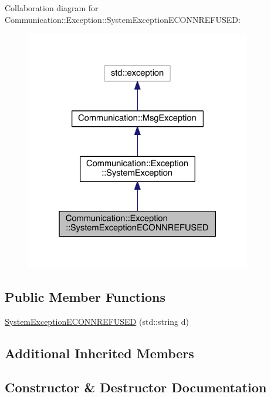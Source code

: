 Collaboration diagram for Communication\+:\+:Exception\+:\+:System\+Exception\+E\+C\+O\+N\+N\+R\+E\+F\+U\+S\+E\+D\+:\nopagebreak
\begin{figure}[H]
\begin{center}
\leavevmode
\includegraphics[width=280pt]{class_communication_1_1_exception_1_1_system_exception_e_c_o_n_n_r_e_f_u_s_e_d__coll__graph}
\end{center}
\end{figure}
\subsection*{Public Member Functions}
\begin{DoxyCompactItemize}
\item 
\hyperlink{class_communication_1_1_exception_1_1_system_exception_e_c_o_n_n_r_e_f_u_s_e_d_aed4c9072aec36c7ee1eba8a8189bdd0c}{System\+Exception\+E\+C\+O\+N\+N\+R\+E\+F\+U\+S\+E\+D} (std\+::string d)
\end{DoxyCompactItemize}
\subsection*{Additional Inherited Members}


\subsection{Constructor \& Destructor Documentation}
\hypertarget{class_communication_1_1_exception_1_1_system_exception_e_c_o_n_n_r_e_f_u_s_e_d_aed4c9072aec36c7ee1eba8a8189bdd0c}{}

